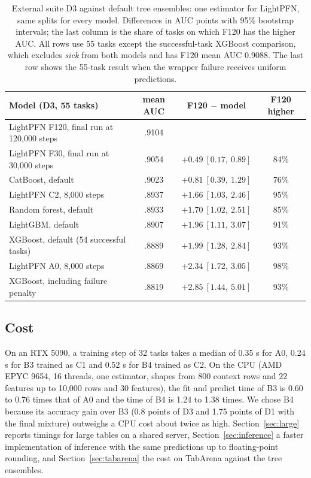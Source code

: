 \documentclass[11pt]{article}
\begin{document}
\begin{table}[t]
\centering
\small
\begin{tabular}{lccc}
\toprule
Model (D3, 55 tasks) & mean AUC & F120 $-$ model & F120 higher \\
\midrule
\rowcolor{orange!12}
LightPFN F120, final run at 120,000 steps & .9104 & & \\
LightPFN F30, final run at 30,000 steps & .9054 & $+0.49\ [0.17,\ 0.89]$ & 84\% \\
CatBoost, default & .9023 & $+0.81\ [0.39,\ 1.29]$ & 76\% \\
LightPFN C2, 8,000 steps & .8937 & $+1.66\ [1.03,\ 2.46]$ & 95\% \\
Random forest, default & .8933 & $+1.70\ [1.02,\ 2.51]$ & 85\% \\
LightGBM, default & .8907 & $+1.96\ [1.11,\ 3.07]$ & 91\% \\
XGBoost, default (54 successful tasks) & .8889 & $+1.99\ [1.28,\ 2.84]$ & 93\% \\
LightPFN A0, 8,000 steps & .8869 & $+2.34\ [1.72,\ 3.05]$ & 98\% \\
XGBoost, including failure penalty & .8819 & $+2.85\ [1.44,\ 5.01]$ & 93\% \\
\bottomrule
\end{tabular}
\caption{External suite D3 against default tree ensembles: one estimator for LightPFN, same splits for
every model. Differences in AUC points with 95\% bootstrap intervals; the last column is the share
of tasks on which F120 has the higher AUC. All rows use 55 tasks except the successful-task XGBoost
comparison, which excludes \emph{sick} from both models and has F120 mean AUC 0.9088. The last row
shows the 55-task result when the wrapper failure receives uniform predictions.}
\label{tab:gbdt}
\end{table}

\subsection{Cost}
\label{sec:cost}
On an RTX 5090, a training step of 32 tasks takes a median of 0.35 s for A0, 0.24 s for B3 trained
as C1 and 0.52 s for B4 trained as C2. On the CPU (AMD EPYC 9654, 16 threads, one estimator, shapes
from 800 context rows and 22 features up to 10,000 rows and 30 features), the fit and predict time of
B3 is 0.60 to 0.76 times that of A0 and the time of B4 is 1.24 to 1.38 times. We chose B4 because
its accuracy gain over B3 (0.8 points of D3 and 1.75 points of D1 with the final mixture) outweighs
a CPU cost about twice as high. Section~\ref{sec:large} reports timings for large tables on a shared
server, Section~\ref{sec:inference} a faster implementation of inference with the same predictions up to
floating-point rounding, and
Section~\ref{sec:tabarena} the cost on TabArena against the tree ensembles.
\end{document}
